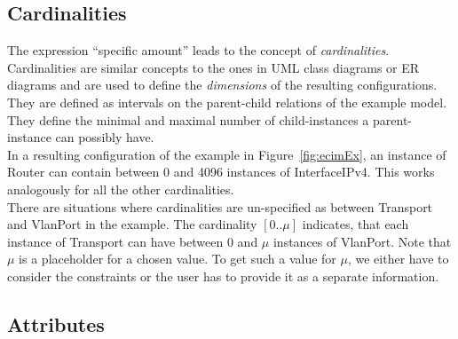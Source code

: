 \subsection{Cardinalities}\label{subsec:card}

The expression ``specific amount'' leads to the concept of \emph{cardinalities}. Cardinalities are similar concepts to the ones in UML class diagrams or ER diagrams and are used to define the \emph{dimensions} of the resulting configurations. They are defined as intervals on the parent-child relations of the example model. They define the minimal and maximal number of child-instances a parent-instance can possibly have. \\
In a resulting configuration of the example in Figure~\ref{fig:ecimEx}, an instance of \textsf{Router} can contain between 0 and 4096 instances of \textsf{InterfaceIPv4}. This works analogously for all the other cardinalities.\\

There are situations where cardinalities are un-specified as between \textsf{Transport} and \textsf{VlanPort} in the example. The cardinality $[0..\mu]$ indicates, that each instance of \textsf{Transport} can have between 0 and $\mu$ instances of \textsf{VlanPort}. Note that $\mu$ is a placeholder for a chosen value. To get such a value for $\mu$, we either have to consider the constraints or the user has to provide it as a separate information.

\subsection{Attributes}\label{subsec:attr}

